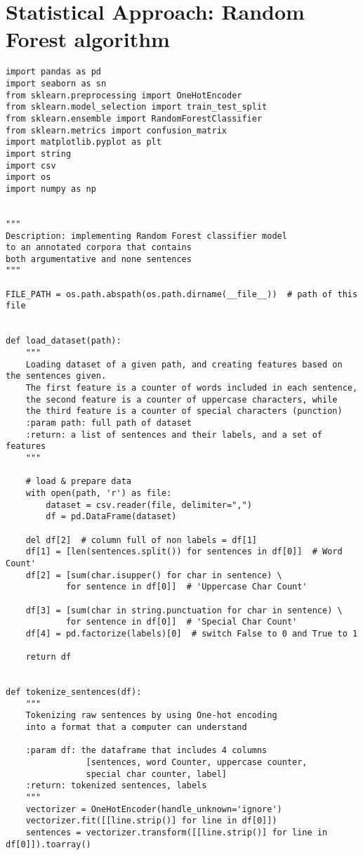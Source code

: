 
\chapter{Statistical Approach: Random Forest algorithm}

\label{Appendix9}

\begin{lstlisting}[language=iPython]
import pandas as pd
import seaborn as sn
from sklearn.preprocessing import OneHotEncoder
from sklearn.model_selection import train_test_split
from sklearn.ensemble import RandomForestClassifier
from sklearn.metrics import confusion_matrix
import matplotlib.pyplot as plt
import string
import csv
import os
import numpy as np


"""
Description: implementing Random Forest classifier model
to an annotated corpora that contains 
both argumentative and none sentences
"""

FILE_PATH = os.path.abspath(os.path.dirname(__file__))  # path of this file


def load_dataset(path):
	"""
	Loading dataset of a given path, and creating features based on the sentences given.
	The first feature is a counter of words included in each sentence,
	the second feature is a counter of uppercase characters, while
	the third feature is a counter of special characters (punction)
	:param path: full path of dataset
	:return: a list of sentences and their labels, and a set of features
	"""
	
	# load & prepare data
	with open(path, 'r') as file:
		dataset = csv.reader(file, delimiter=",")
		df = pd.DataFrame(dataset)
	
	del df[2]  # column full of non	labels = df[1]
	df[1] = [len(sentences.split()) for sentences in df[0]]  # Word Count'
	df[2] = [sum(char.isupper() for char in sentence) \
			for sentence in df[0]]  # 'Uppercase Char Count'
	
	df[3] = [sum(char in string.punctuation for char in sentence) \
			for sentence in df[0]]  # 'Special Char Count'
	df[4] = pd.factorize(labels)[0]  # switch False to 0 and True to 1
	
	return df


def tokenize_sentences(df):
	"""
	Tokenizing raw sentences by using One-hot encoding
	into a format that a computer can understand
	
	:param df: the dataframe that includes 4 columns
				[sentences, word Counter, uppercase counter,
				special char counter, label]
	:return: tokenized sentences, labels
	"""
	vectorizer = OneHotEncoder(handle_unknown='ignore')
	vectorizer.fit([[line.strip()] for line in df[0]])
	sentences = vectorizer.transform([[line.strip()] for line in df[0]]).toarray()
	

\end{lstlisting}
